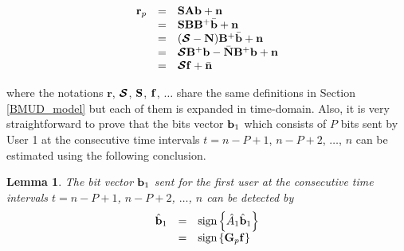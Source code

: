 \documentclass[a4paper,11pt,fleqn]{article}
\newtheorem{lemma}{Lemma}
\newcommand{\br}{{\mathbf r}}
\newcommand{\bA}{{\mathbf A}}
\newcommand{\bb}{{\bf b}}
\newcommand{\bG}{{\bf G}}
\newcommand{\bn}{{\bf n}}
\newcommand{\bbf}{{\bf f}}
\newcommand{\bN}{{\bf N}}
\newcommand{\bS}{{\bf S}}
\newcommand{\bB}{{\bf B}}
\newcommand{\bcS}{{\mbox {\boldmath ${\cal S}$}}}
\begin{document}
\begin{equation}
\begin{array}{rcl}
\br_p&=&\bS\bA\bb + \bn\\
 &=&\bS\bB\bB^{+}\bar\bb + \bn\\
 &=&(\bcS-{\bN})\bB^{+}\bar\bb + \bn\\
 &=&\bcS\bB^{+}\bb-\bar{\bN}\bB^{+}\bb + \bn\\
 &=&\bcS\bbf + \bar{\bn} \label{rn}
\end{array}
\end{equation}

\noindent where the notations $\br$, $\bcS$, $\bS$, $\bbf$,
$\ldots$ share the same definitions in Section \ref{BMUD_model}
but each of them is expanded in time-domain. Also, it is very
straightforward to prove that the bits vector $\bb_1$ which
consists of $P$ bits sent by User 1 at the consecutive time
intervals $t=n-P+1$, $n-P+2$, $\ldots$, $n$ can be estimated using
the following conclusion.

\begin{lemma}
The bit vector $\bb_1$ sent for the first user at the consecutive
time intervals $t=n-P+1$, $n-P+2$, $\ldots$, $n$ can be detected
by
\begin{equation}
\begin{array}{rcl}
\hat{\bb}_1&=&\mbox{sign}\left\{\hat{A}_1\hat{\bb}_1\right\}\\
&=&\mbox{sign}\left\{\bG_p\bbf\right\}
\end{array}\label{bb_estimate}
\end{equation}

\end{lemma}
\end{document}

